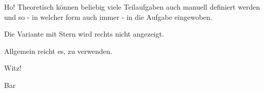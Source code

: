 \documentclass{sp-exam}
\date{12. März 2024}
\begin{document}
   \maketitle

   
   

   \begin{Exercise}{Ho!}
      Theoretisch können beliebig viele Teilaufgaben auch manuell definiert werden und so - in welcher form auch immer - in die Aufgabe eingewoben.

      Die Variante mit Stern wird rechts nicht angezeigt.

      Allgemein reicht es, \string\Subtask\space zu verwenden.
   \end{Exercise}

   \begin{Exercise}[1]{Witz!}
   \end{Exercise}
   \appendix
   Bar
\end{document}
